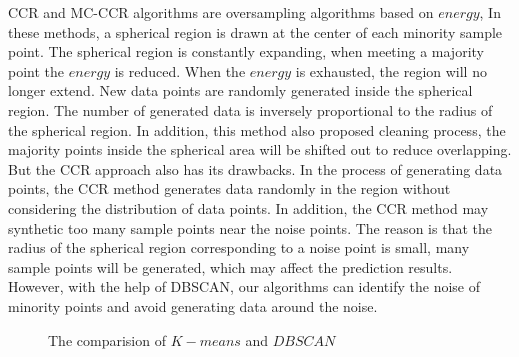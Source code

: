 \documentclass[ida]{iosart2x}
\begin{document}
CCR \cite{2017CCR} and MC-CCR \cite{2020Combined} algorithms are oversampling algorithms based on $energy$,
In these methods, a spherical region is drawn at the center of each minority sample point. 
The spherical region is constantly expanding, when meeting a majority point the $energy$ is reduced.
When the $energy$ is exhausted, the region will no longer extend.
New data points are randomly generated inside the spherical region. 
The number of generated data is inversely proportional to the radius of the spherical region.
In addition, this method also proposed cleaning process, 
the majority points inside the spherical area will be shifted out to reduce overlapping.
But the CCR approach also has its drawbacks. In the process of generating data points,
the CCR method generates data randomly in the region without considering the distribution of data points.
In addition, the CCR method may synthetic too many sample points near the noise points. 
The reason is that the radius of the spherical region corresponding 
to a noise point is small, 
many sample points will be generated, which may affect the prediction results.
However, with the help of DBSCAN, our algorithms can identify the noise of minority points and 
avoid generating data around the noise.
\begin{figure}[tb]
  \centering
  \quad
  \caption{The comparision of $K-means$ and $DBSCAN$}
  \label{fig19}
  \end{figure}
\end{document}
